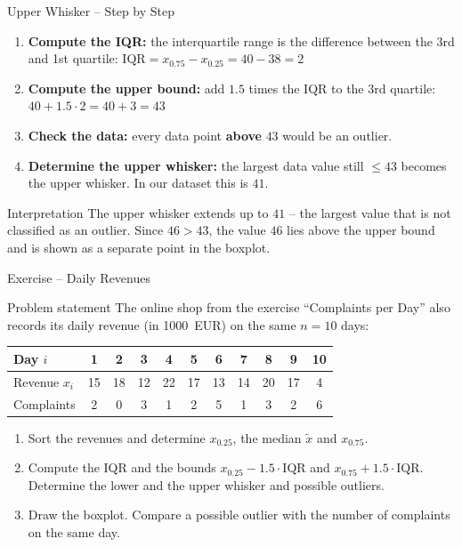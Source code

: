 \documentclass[aspectratio=169,11pt]{beamer}
\begin{document}
\begin{frame}{Upper Whisker -- Step by Step}
  \begin{enumerate}
    \item \textbf{Compute the IQR:} the interquartile range is the difference
      between the 3rd and 1st quartile: $\text{IQR} = x_{0.75} - x_{0.25} = 40 - 38 = 2$
    \item \textbf{Compute the upper bound:} add $1.5$ times the IQR to
      the 3rd quartile: $40 + 1.5 \cdot 2 = 40 + 3 = 43$
    \item \textbf{Check the data:} every data point \textbf{above} $43$
      would be an outlier.
    \item \textbf{Determine the upper whisker:} the largest data value still
      $\le 43$ becomes the upper whisker. In our dataset this is $41$.
  \end{enumerate}
  \vspace{0.3cm}
  \begin{alertblock}{Interpretation}
    The upper whisker extends up to $41$ -- the largest value that is not classified as an outlier.
    Since $46 > 43$, the value $46$ lies above the upper bound and is shown as a separate point in the boxplot.
  \end{alertblock}
\end{frame}

\begin{frame}{Exercise -- Daily Revenues}
  \begin{block}{Problem statement}
    The online shop from the exercise ``Complaints per Day'' also records its
    daily revenue (in 1000~EUR) on the same $n = 10$ days:
    \begin{center}
      \renewcommand{\arraystretch}{1.05}
      \begin{tabular}{l*{10}{c}}
        \toprule
        Day $i$ & 1 & 2 & 3 & 4 & 5 & 6 & 7 & 8 & 9 & 10 \\
        \midrule
        Revenue $x_i$ & 15 & 18 & 12 & 22 & 17 & 13 & 14 & 20 & 17 & 4 \\
        Complaints & 2 & 0 & 3 & 1 & 2 & 5 & 1 & 3 & 2 & 6 \\
        \bottomrule
      \end{tabular}
    \end{center}
    \vspace{-0.15cm}
    \begin{enumerate}
      \item Sort the revenues and determine $x_{0.25}$, the median $\tilde{x}$
        and $x_{0.75}$.
      \item Compute the IQR and the bounds $x_{0.25} - 1.5 \cdot \text{IQR}$ and
        $x_{0.75} + 1.5 \cdot \text{IQR}$. Determine the lower and the upper
        whisker and possible outliers.
      \item Draw the boxplot. Compare a possible outlier with the number of
        complaints on the same day.
    \end{enumerate}
  \end{block}
\end{frame}
\end{document}
